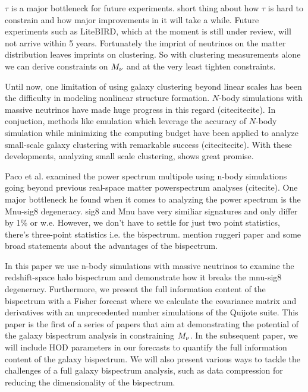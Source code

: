$\tau$ is a major bottleneck for future experiments. 
short thing about how $\tau$ is hard to constrain and how major improvements in it 
will take a while. Future experiments such as LiteBIRD, which at the moment is still
under review, will not arrive within 5 years. 
Fortunately the imprint of neutrinos on the matter distribution leaves imprints
on clustering. So with clustering measurements alone we can derive constraints 
on $M_\nu$ and at the very least tighten constraints.  

Until now, one limitation of using galaxy clustering beyond linear scales has been 
the difficulty in modeling nonlinear structure formation. $N$-body simulations with
massive neutrinos have made huge progress in this regard (citecitecite). In 
conjuction, methods like emulation which leverage the accuracy of $N$-body simulation
while minimizing the computing budget have been applied to analyze small-scale galaxy
clustering with remarkable success (citecitecite). With these developments, analyzing 
small scale clustering, shows great promise. 

Paco et al. examined the power spectrum multipole using n-body simulations going beyond
previous real-space matter powerspectrum analyses (citecite). One major bottleneck he 
found when it comes to analyzing the power spectrum is the Mnu-sig8 degeneracy. 
sig8 and Mnu have very similiar signatures and only differ by 1\% or w.e. 
However, we don't have to settle for just two point statistics, there's three-point 
statistics i.e. the bispectrum. mention ruggeri paper and some broad statements about
the advantages of the bispectrum. 

In this paper we use n-body simulations with massive neutrinos to examine the 
redshift-space halo bispectrum and demonstrate how it breaks the mnu-sig8 degeneracy. 
Furthermore, we present the full information content of the bispectrum with a Fisher 
forecast where we calculate the covariance matrix and derivatives with an unprecedented 
number simulations of the Quijote suite. This paper is the first of a series of 
papers that aim at demonstrating the potential of the galaxy bispectrum analysis in 
constraining $M_\nu$. In the subsequent paper, we will include HOD parameters in our 
forecasts to quantify the full information content of the galaxy bispectrum. We will
also present various ways to tackle the challenges of a full galaxy bispectrum analysis, 
such as data compression for reducing the dimensionality of the bispectrum. 

